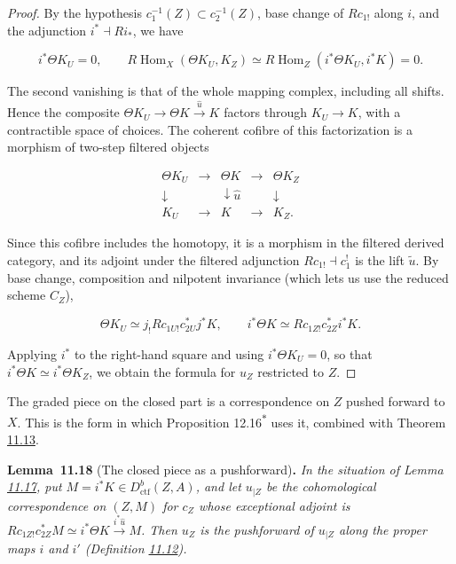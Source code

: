 \documentclass[11pt]{article}
\newenvironment{bpstatement}[2]{\par\addvspace{0.6\baselineskip}\noindent\textbf{#1}#2\textbf{.}\enspace\ignorespaces}
  {\par\addvspace{0.4\baselineskip}}
\newenvironment{bpstatementit}[2]{\begin{bpstatement}{#1}{#2}\itshape\ignorespaces}{\end{bpstatement}}
\newcommand{\bpout}[1]{#1\textsuperscript{\hyperlink{bp-outside}{\ensuremath{\ast}}}}
\begin{document}
\begin{proof}[{Proof}]\label{bp49}%
By the hypothesis \(c_1^{-1}(Z)\subset c_2^{-1}(Z)\), base change of \(Rc_{1!}\) along \(i\), and the adjunction \(i^*\dashv Ri_*\), we have

\[
i^*\Theta K_U=0,\qquad
R\operatorname{Hom}_X(\Theta K_U,K_Z)
\simeq R\operatorname{Hom}_Z(i^*\Theta K_U,i^*K)=0.
\]

The second vanishing is that of the whole mapping complex, including all shifts. Hence the composite \(\Theta K_U\to\Theta K\xrightarrow{\widehat u}K\) factors through \(K_U\to K\), with a contractible space of choices. The coherent cofibre of this factorization is a morphism of two-step filtered objects

\[
\begin{array}{ccccc}
\Theta K_U&\longrightarrow&\Theta K&\longrightarrow&\Theta K_Z\\
\downarrow&&\downarrow \widehat u&&\downarrow\\
K_U&\longrightarrow&K&\longrightarrow&K_Z.
\end{array}
\]

Since this cofibre includes the homotopy, it is a morphism in the filtered derived category, and its adjoint under the filtered adjunction \(Rc_{1!}\dashv c_1^!\) is the lift \(\tilde u\). By base change, composition and nilpotent invariance (which lets us use the reduced scheme \(C_Z\)),

\[
\Theta K_U\simeq j_!Rc_{1U!}c_{2U}^*j^*K,
\qquad i^*\Theta K\simeq Rc_{1Z!}c_{2Z}^*i^*K.
\]

Applying \(i^*\) to the right-hand square and using \(i^*\Theta K_U=0\), so that \(i^*\Theta K\simeq i^*\Theta K_Z\), we obtain the formula for \(\widehat u_Z\) restricted to \(Z\).
\end{proof}

\label{bp50}%
The graded piece on the closed part is a correspondence on \(Z\) pushed forward to \(X\). This is the form in which Proposition \bpout{12.16} uses it, combined with Theorem \hyperref[bp37]{11.13}.

\label{bp51}%
\begin{bpstatementit}{Lemma~11.18}{ (The closed piece as a pushforward)}
In the situation of Lemma \hyperref[bp48]{11.17}, put \(M=i^*K\in D^b_{\mathrm{ctf}}(Z,A)\), and let \(u_{|Z}\) be the cohomological correspondence on \((Z,M)\) for \(c_Z\) whose exceptional adjoint is \(Rc_{1Z!}c_{2Z}^*M\simeq i^*\Theta K\xrightarrow{i^*\widehat u}M\). Then \(u_Z\) is the pushforward of \(u_{|Z}\) along the proper maps \(i\) and \(i'\) (Definition \hyperref[bp35]{11.12}).
\end{bpstatementit}
\end{document}
